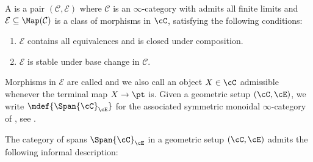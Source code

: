 \begin{defn}\label{defn: geometric setup}
A  is a pair $(\mathcal C, \mathcal E)$ where $\mathcal C$ is an $\infty$-category with admits all finite limits
and $\mathcal E \subseteq \Map (\mathcal C)$ is a class of morphisms
in $\cC$, satisfying the following conditions:
\begin{enumerate}[label=(\roman*)]
    \item $\mathcal E$ contains all equivalences and is closed under composition.
    \item $\mathcal E$ is stable under base change in $\mathcal C$.
\end{enumerate}
Morphisms in $\mathcal E$ are called  and we also call
an object $X\in \cC$ admissible whenever the terminal map $X\to \pt$ is.
Given a geometric setup $(\cC,\cE)$, we write $\mdef{\Span{\cC}_{\cE}}$ for the associated
symmetric monoidal $\infty$-category of , see . 
\end{defn}
The category of spans $\Span{\cC}_{\cE}$ in a geometric
setup $(\cC,\cE)$ admits the following informal description:
